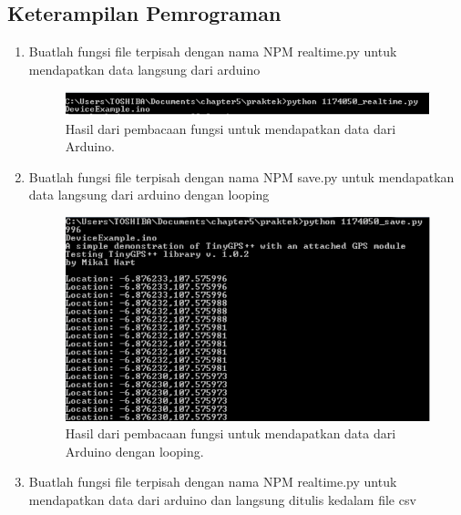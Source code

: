 \subsection{Keterampilan Pemrograman}
\begin{enumerate}
	\item Buatlah fungsi file terpisah dengan nama NPM realtime.py untuk mendapatkan data langsung dari arduino
	

	\begin{figure}[H]
		\includegraphics[width=12cm]{figures/5/1174034/Praktek/1.PNG}
		\centering
		\caption{Hasil dari pembacaan fungsi untuk mendapatkan data dari Arduino.}
	\end{figure}
	
	\item Buatlah fungsi file terpisah dengan nama NPM save.py untuk mendapatkan data langsung dari arduino dengan looping
	

	\begin{figure}[H]
		\includegraphics[width=12cm]{figures/5/1174034/Praktek/2.PNG}
		\centering
		\caption{Hasil dari pembacaan fungsi untuk mendapatkan data dari Arduino dengan looping.}
	\end{figure}
	
	\item Buatlah fungsi file terpisah dengan nama NPM realtime.py untuk mendapatkan data dari arduino dan langsung ditulis kedalam file csv
	


\end{enumerate}
